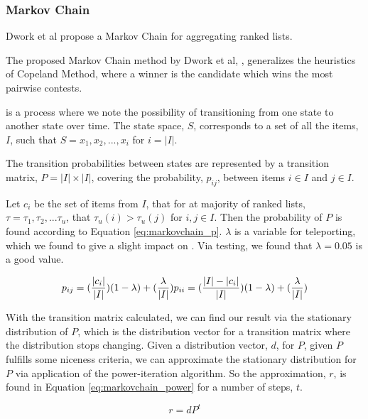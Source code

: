 \subsubsection{Markov Chain}\label{sec:markovchain}
Dwork et al propose a Markov Chain for aggregating ranked lists\cite{rank:aggregation}.

The proposed Markov Chain method by Dwork et al, \MC, generalizes the heuristics of Copeland Method\cite{saari1996}, where a winner is the candidate which wins the most pairwise contests.

\MC is a process where we note the possibility of transitioning from one state to another state over time. The \MC state space, $S$, corresponds to a set of all the items, $I$, such that $S = {x_1, x_2,..., x_i}$ for $i = |I|$.

The transition probabilities between states are represented by a transition matrix, $P = |I| \times |I|$, covering the probability, $p_{ij}$, between items $i \in I$ and $j \in I$.

Let $c_i$ be the set of items from $I$, that for at majority of ranked lists, $\tau = {\tau_1, \tau_2,...\tau_u}$, that $\tau_u(i) > \tau_u(j)$ for $i,j \in I$. Then the probability of $P$ is found according to Equation \ref{eq:markovchain_p}.
$\lambda$ is a variable for teleporting, which we found to give a slight impact on . Via testing, we found that $\lambda = 0.05$ is a good value.

\begin{equation}\label{eq:markovchain_p}
p_{ij} = (\frac{|c_i|}{|I|})(1-\lambda)+(\frac{\lambda}{|I|})\\
p_{ii} = (\frac{|I|-|c_i|}{|I|})(1-\lambda)+(\frac{\lambda}{|I|})
\end{equation}

With the transition matrix calculated, we can find our result via the stationary distribution of $P$, which is the distribution vector for a transition matrix where the distribution stops changing. Given a distribution vector, $d$, for $P$, given $P$ fulfills some niceness criteria, we can approximate the stationary distribution for $P$ via application of the power-iteration algorithm. So the approximation, $r$, is found in Equation \ref{eq:markovchain_power} for a number of steps, $t$.

\begin{equation}\label{eq:markovchain_power}
r = dP^t
\end{equation}


